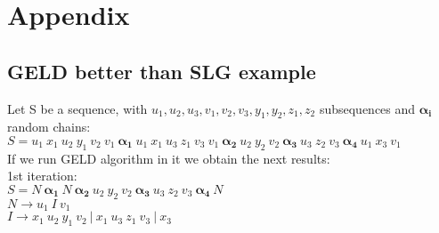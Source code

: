 \chapter{Appendix}

\section{GELD better than SLG example}

Let S be a sequence, with $u_1,u_2,u_3,v_1,v_2,v_3, y_1, y_2, z_1, z_2$ subsequences and $\bm{\alpha_i}\ $ random chains: \\

$S = u_1\ x_1\ u_2\ y_1\ v_2\ v_1\  \bm{\alpha_1}\ u_1\ x_1\ u_3\ z_1\ v_3\ v_1\ \bm{\alpha_2}\ u_2\ y_2\ v_2\ \bm{\alpha_3}\ u_3\ z_2\ v_3\ \bm{\alpha_4}\ u_1\ x_3\ v_1$ \\

If we run GELD algorithm in it we obtain the next results: \\
1st iteration: \\ 
$S = N\ \bm{\alpha_1}\ N\ \bm{\alpha_2}\ u_2\ y_2\ v_2\ \bm{\alpha_3}\ u_3\ z_2\ v_3\ \bm{\alpha_4}\ N$ \\
$N \rightarrow u_1\ I\ v_1$ \\
$I \rightarrow x_1\ u_2\ y_1\ v_2\ |\ x_1\ u_3\ z_1\ v_3\ |\ x_3$  